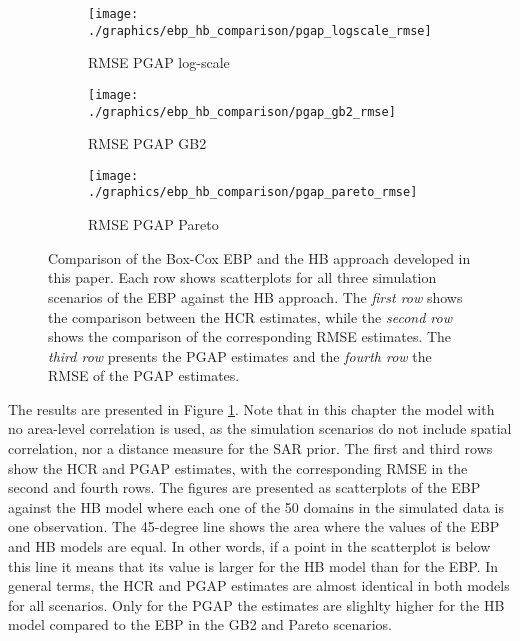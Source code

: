 \begin{figure}
    \begin{subfigure}{0.31\linewidth}
        \centering
        \texttt{[image: ./graphics/ebp\_hb\_comparison/pgap\_logscale\_rmse]}
        \caption{RMSE PGAP log-scale}
    \end{subfigure}
    \begin{subfigure}{0.31\linewidth}
        \centering
        \texttt{[image: ./graphics/ebp\_hb\_comparison/pgap\_gb2\_rmse]}
        \caption{RMSE PGAP GB2}
    \end{subfigure}
    \begin{subfigure}{0.31\linewidth}
        \centering
        \texttt{[image: ./graphics/ebp\_hb\_comparison/pgap\_pareto\_rmse]}
        \caption{RMSE PGAP Pareto}
    \end{subfigure}
    \caption[Comparison of EBP and HB approaches with simulated data.]{Comparison of the Box-Cox EBP and the HB approach developed in this paper. Each row shows scatterplots for all three simulation scenarios of the EBP against the HB approach. The \textit{first row} shows the comparison between the HCR estimates, while the \textit{second row} shows the comparison of the corresponding RMSE estimates. The \textit{third row} presents the PGAP estimates and the \textit{fourth row} the RMSE of the PGAP estimates.}
    \label{fig:ebp_hb_comparison}
\end{figure}

The results are presented in Figure \ref{fig:ebp_hb_comparison}.
Note that in this chapter the model with no area-level correlation is used, as the simulation scenarios do not include spatial correlation, nor a distance measure for the SAR prior.
The first and third rows show the HCR and PGAP estimates, with the corresponding RMSE in the second and fourth rows.
The figures are presented as scatterplots of the EBP against the HB model where each one of the 50 domains in the simulated data is one observation.
The 45-degree line shows the area where the values of the EBP and HB models are equal.
In other words, if a point in the scatterplot is below this line it means that its value is larger for the HB model than for the EBP.
In general terms, the HCR and PGAP estimates are almost identical in both models for all scenarios.
Only for the PGAP the estimates are slighlty higher for the HB model compared to the EBP in the GB2 and Pareto scenarios.


